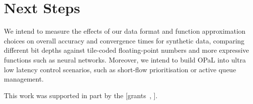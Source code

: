 \documentclass[
sigconf,natbib=false
]{acmart}
\newcommand{\approachshort}{OPaL}
\begin{document}
%

\section{Next Steps}
We intend to measure the effects of our data format and function approximation choices on overall accuracy and convergence times for synthetic data, comparing different bit depths against tile-coded floating-point numbers and more expressive functions such as neural networks.
Moreover, we intend to build \approachshort{} into ultra low latency control scenarios, such as short-flow prioritisation or active queue management.

\begin{acks}
	This work was supported in part by the  [grants~, ].
\end{acks}

%
%

\printbibliography
	
\end{document}

